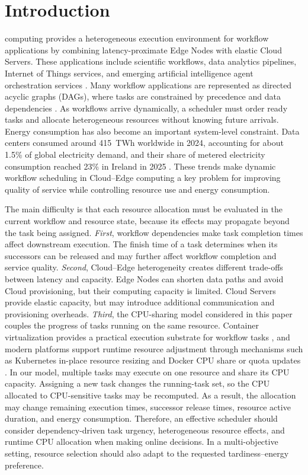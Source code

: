 \documentclass[10pt,journal]{IEEEtran}
\begin{document}
\section{Introduction}
\label{Sec: introduction}
 computing provides a heterogeneous execution environment for workflow applications by combining latency-proximate Edge Nodes with elastic Cloud Servers. These applications include scientific workflows, data analytics pipelines, Internet of Things services, and emerging artificial intelligence agent orchestration services \cite{Li2026,Bouabdallah2024,Coleman2022WfCommons,Gartner2025AgenticAI}. Many workflow applications are represented as directed acyclic graphs (DAGs), where tasks are constrained by precedence and data dependencies \cite{Li2026,Bouabdallah2024,Coleman2022WfCommons}. As workflows arrive dynamically, a scheduler must order ready tasks and allocate heterogeneous resources without knowing future arrivals. Energy consumption has also become an important system-level constraint. Data centers consumed around 415~TWh worldwide in 2024, accounting for about 1.5\% of global electricity demand, and their share of metered electricity consumption reached 23\% in Ireland in 2025 \cite{IEA2025EnergyAI,CSO2026DataCentres}. These trends make dynamic workflow scheduling in Cloud--Edge computing a key problem for improving quality of service while controlling resource use and energy consumption.

The main difficulty is that each resource allocation must be evaluated in the current workflow and resource state, because its effects may propagate beyond the task being assigned. \emph{First}, workflow dependencies make task completion times affect downstream execution. The finish time of a task determines when its successors can be released and may further affect workflow completion and service quality. \emph{Second}, Cloud--Edge heterogeneity creates different trade-offs between latency and capacity. Edge Nodes can shorten data paths and avoid Cloud provisioning, but their computing capacity is limited. Cloud Servers provide elastic capacity, but may introduce additional communication and provisioning overheads. \emph{Third}, the CPU-sharing model considered in this paper couples the progress of tasks running on the same resource. Container virtualization provides a practical execution substrate for workflow tasks \cite{Ranjan2020}, and modern platforms support runtime resource adjustment through mechanisms such as Kubernetes in-place resource resizing and Docker CPU share or quota updates \cite{Kubernetes2026Resize,DockerUpdate2026,DockerResourceConstraints2026}. In our model, multiple tasks may execute on one resource and share its CPU capacity. Assigning a new task changes the running-task set, so the CPU allocated to CPU-sensitive tasks may be recomputed. As a result, the allocation may change remaining execution times, successor release times, resource active duration, and energy consumption. Therefore, an effective scheduler should consider dependency-driven task urgency, heterogeneous resource effects, and runtime CPU allocation when making online decisions. In a multi-objective setting, resource selection should also adapt to the requested tardiness--energy preference.
\end{document}
